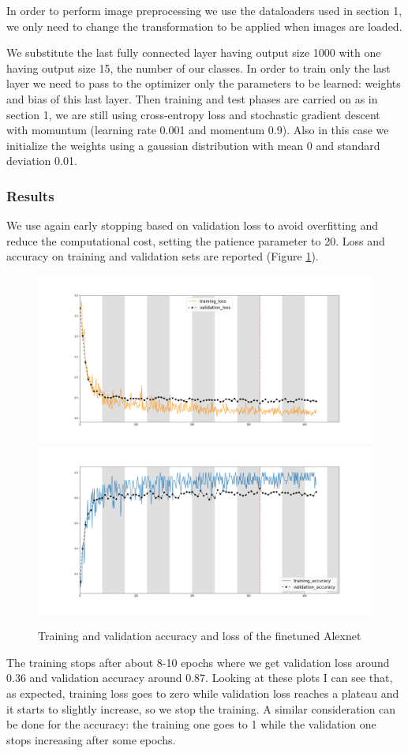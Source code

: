 \documentclass[12pt, a4paper]{report}
\begin{document}
In order to perform image preprocessing we use the dataloaders used in section 1, we only need to change the transformation to be applied when images are loaded.

We substitute the last fully connected layer having output size 1000 with one having output size 15, the number of our classes. In order to train only the last layer we need to pass to the optimizer only the parameters to be learned: weights and bias of this last layer. Then training and test phases are carried on as in section 1, we are still using cross-entropy loss and stochastic gradient descent with momuntum (learning rate 0.001 and momentum 0.9).
Also in this case we initialize the weights using a gaussian distribution with mean 0 and standard deviation 0.01.

\subsubsection*{Results}

We use again early stopping based on validation loss to avoid overfitting and reduce the computational cost, setting the patience parameter to 20. Loss and accuracy on training and validation sets are reported (Figure \ref{fig:finetune}).

\begin{figure}[h!]
	\centering
	{\includegraphics[width=.49\textwidth]{img/loss_finetune.png}}
	{\includegraphics[width=.49\textwidth]{img/acc_finetune.png}}
	\caption{Training and validation accuracy and loss of the finetuned Alexnet}
	\label{fig:finetune}
\end{figure}

The training stops after about 8-10 epochs where we get validation loss around 0.36 and validation accuracy around 0.87. 
Looking at these plots I can see that, as expected, training loss goes to zero while validation loss reaches a plateau and it starts to slightly increase, so we stop the training.
A similar consideration can be done for the accuracy: the training one goes to 1 while the validation one stops increasing after some epochs.
\end{document}

